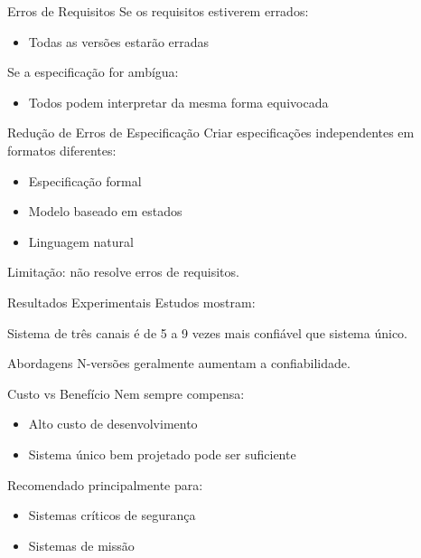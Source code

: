 \documentclass[9pt]{beamer}
\begin{document}

\begin{frame}{Erros de Requisitos}
Se os requisitos estiverem errados:

\begin{itemize}
\item Todas as versões estarão erradas
\end{itemize}

Se a especificação for ambígua:

\begin{itemize}
\item Todos podem interpretar da mesma forma equivocada
\end{itemize}
\end{frame}


\begin{frame}{Redução de Erros de Especificação}
Criar especificações independentes em formatos diferentes:

\begin{itemize}
\item Especificação formal
\item Modelo baseado em estados
\item Linguagem natural
\end{itemize}

\bigskip

Limitação: não resolve erros de requisitos.
\end{frame}


\begin{frame}{Resultados Experimentais}
Estudos mostram:

Sistema de três canais é de 5 a 9 vezes mais confiável que sistema único.

\bigskip

Abordagens N-versões geralmente aumentam a confiabilidade.
\end{frame}


\begin{frame}{Custo vs Benefício}
Nem sempre compensa:

\begin{itemize}
\item Alto custo de desenvolvimento
\item Sistema único bem projetado pode ser suficiente
\end{itemize}

Recomendado principalmente para:

\begin{itemize}
\item Sistemas críticos de segurança
\item Sistemas de missão
\end{itemize}
\end{frame}
\end{document}
